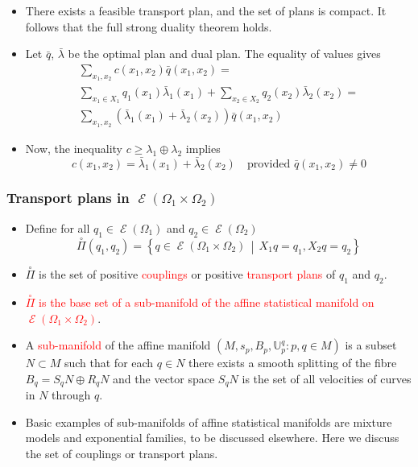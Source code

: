 \documentclass[xcolor=svgnames]{beamer}
\DeclareMathOperator{\Maxexp}{\mathcal E}
\newcommand{\eBspace}[1]{B_{#1}}
\newcommand{\maxexpat}[1]{\Maxexp\left(#1\right)}
\newcommand{\rosso}[1]{\textcolor{red}{#1}}
\newcommand{\setof}[2]{\left\{#1 \, \middle| \, #2 \right\}}
\newcommand{\transport}[2]{{\mathbb U} _ {#1} ^ {#2}}
\renewcommand{\emph}{\rosso}
\begin{document}
\begin{frame}
\begin{itemize}
    \item There exists a feasible transport plan, and the set of plans is compact. It follows that the full strong duality theorem holds.
    \item Let $\bar q$, $\bar \lambda$ be the optimal plan and dual plan. The equality of values gives
    \begin{multline*}
    \sum_{x_1,x_2} c(x_1,x_2)\bar q(x_1,x_2) = \\ \sum_{x_1\in X_1}q_1(x_1) \bar \lambda_1(x_1) + \sum_{x_2 \in X_2} q_2(x_2) \bar \lambda_2(x_2) = \\
    \sum_{x_1,x_2} \left(\bar \lambda_1(x_1) + \bar \lambda_2(x_2)\right) \bar q(x_1,x_2) 
    \end{multline*}
    \item Now, the inequality $c \geq \lambda_1 \oplus \lambda _2$ implies
    \begin{equation*}
        c(x_1,x_2)=\bar \lambda_1(x_1) + \bar \lambda_2(x_2) \quad \text{provided $\bar q(x_1,x_2) \neq 0$}
    \end{equation*}
\end{itemize}
    
\end{frame}

\begin{frame}[plain]\small\frametitle{Transport plans in $\maxexpat {\Omega_1 \times \Omega_2}$}
 \begin{itemize}
 
     \item Define for all $q_1 \in \maxexpat{\Omega_1}$ and $q_2 \in \maxexpat{\Omega_2}$
     \begin{equation*}
         \overset{\circ}{\Pi}(q_1,q_2) = \setof{q \in \maxexpat{\Omega_1 \times \Omega_2}}{X_1 q = q_1,X_2 q= q_2}
     \end{equation*}
 
 \item  $\overset{\circ}{\Pi}$ is the set of positive \emph{couplings} or positive \emph{transport plans} of $q_1$ and $q_2$. 
 \item \emph{$\overset{\circ}{\Pi}$ is the base set of a sub-manifold of the affine statistical manifold on $\maxexpat {\Omega_1 \times \Omega_2}$}.

\item A \emph{sub-manifold} of the affine manifold $(M,s_p,\eBspace p,\transport p q \colon p,q \in M)$ is a subset $N \subset M$ such that for each $q \in N$ there exists a smooth splitting of the fibre $\eBspace q = S_q N \oplus R_q N$ and the vector space $S_q N$ is the set of all velocities of curves in $N$ through $q$. 

\item Basic examples of sub-manifolds of affine statistical manifolds are mixture models and exponential families, to be discussed elsewhere. Here we discuss the set of couplings or transport plans.
 \end{itemize}
\end{frame}
\end{document}
